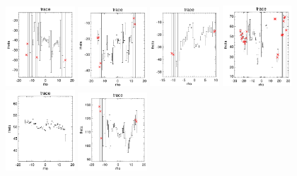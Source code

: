 \documentclass[fleqn,usenatbib]{mnras}
\begin{document}
\begin{figure}
    \includegraphics[width=0.23\textwidth]{Images/trace-plots/trace-plots-cpsbs/8997-3704.png}
    \includegraphics[width=0.23\textwidth]{Images/trace-plots/trace-plots-cpsbs/9047-3701.png}
    \includegraphics[width=0.23\textwidth]{Images/trace-plots/trace-plots-cpsbs/9085-1902.png}
    \includegraphics[width=0.23\textwidth]{Images/trace-plots/trace-plots-cpsbs/9493-12705.png}
    \includegraphics[width=0.23\textwidth]{Images/trace-plots/trace-plots-cpsbs/9494-3701.png}
    \includegraphics[width=0.23\textwidth]{Images/trace-plots/trace-plots-cpsbs/9494-3703.png}

\end{figure}
\end{document}
